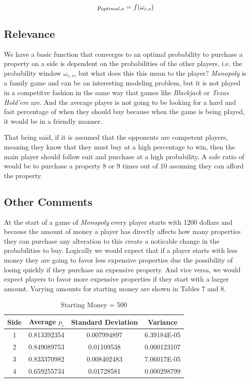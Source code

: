 \documentclass{article}
\begin{document}
\begin{equation}
\centering
p_{optimal,s} = f(\omega_{c,s})
\end{equation}


\subsection{Relevance}

We have a basic function that converges to an optimal probability to purchase a property on a side is dependent on the probabilities of the other players, i.e. the probability window $\omega_{c,s}$, but what does this this mean to the player?  \textit{Monopoly} is a family game and can be an interesting modeling problem, but it is not played in a competitve fashion in the same way that games like \textit{Blackjack} or \textit{Texas Hold'em} are.  And the average player is not going to be looking for a hard and fast percentage of when they should buy because when the game is being played, it would be in a friendly manner.  

That being said, if it is assumed that the opponents are competent players, meaning they know that they must buy at a high percentage to win, then the main player should follow suit and purchase at a high probability.  A safe ratio of would be to purchase a property 8 or 9 times out of 10 assuming they can afford the property.

\subsection{Other Comments}

At the start of a game of \textit{Monopoly} every player starts with 1200 dollars and because the amount of money a player has directly affects how many properties they can purchase any alteration to this create a noticable change in the probabilities to buy.  Logically we would expect that if a player starts with less money they are going to favor less expensive properties due the possibility of losing quickly if they purchase an expensive property. And vice versa, we would expect players to favor more expensive properties if they start with a larger amount.  Varying amounts for starting money are shown in Tables 7 and 8.

\begin{table}[h!]
\centering
\caption{Starting Money = 500}
\label{tab:table1}
\begin{tabular}{|c|c|c|c|}
\hline
Side  & Average $p_i$ & Standard Deviation & Variance\\
\hline
1 &  0.813392354 & 0.007994897 & 6.39184E-05\\
2 &  0.849089753 & 0.01109538 & 0.000123107\\
3 & 0.833370982 & 0.008402483 & 7.06017E-05\\
4 & 0.659255734 & 0.01728581 & 0.000298799\\
\hline
\end{tabular}
\end{table}
\end{document}
